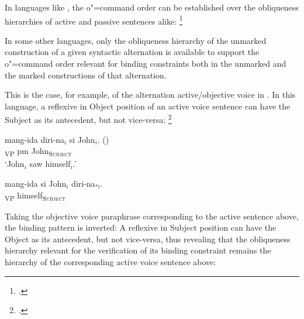 \documentclass[output=paper
,modfonts
,nonflat]{langsci/langscibook}
\begin{document}
In languages like , the o"=command order can be established over the
obliqueness hierarchies of active and passive sentences alike:%
%
\footnote{
\citep{Jackendoff72a-u, polsag:hpsg94}.}


\begin{exe}
\ex
\begin{xlist}
\end{xlist}
\end{exe}



In some other languages, only the obliqueness hierarchy of the unmarked
construction of a given syntactic alternation is available to support
the o"=command order relevant for binding constraints both in the unmarked
and the marked constructions of that alternation.

This is the
case, for example, of the alternation active/objective voice in . 
In this language, a reflexive in Object position of an active voice sentence
can have the Subject as its antecedent, but not vice-versa:%
%
\footnote{
\citep[p.72]{manningSag:1999}.}


\begin{exe}
\ex
\begin{xlist}
\ex
\gll mang-ida diri-na$_{i}$ si John$_{i}$. ()\\ 
[{\sc active}-saw himself\textsubscript{\textsc{Object}}]\textsubscript{VP} {\sc pm} John\textsubscript{\textsc{Subject}} \\
\trans `John$_{i}$ saw himself$_{i}$.'

\ex
\gll mang-ida si John$_{i}$ diri-na$_{*i}$.\\ 
[{\sc active}-saw {\sc pm} John\textsubscript{\textsc{Object}}]\textsubscript{VP} himself\textsubscript{\textsc{Subject}} \\
\end{xlist}
\end{exe}



Taking the objective voice paraphrase corresponding to the active sentence
above, the binding pattern is inverted: A reflexive in Subject position can have
the Object as its antecedent, but not vice-versa, thus revealing that
the obliqueness hierarchy relevant for the verification of its binding
constraint remains the hierarchy of the corresponding active voice
sentence above:
\end{document}
